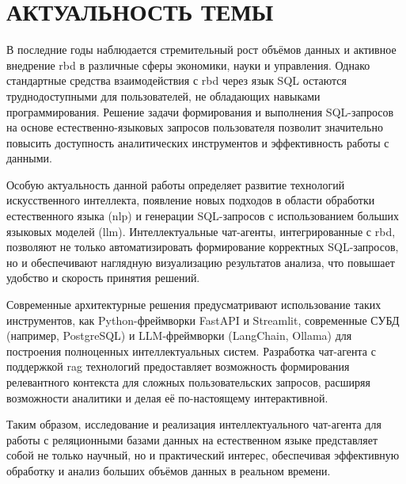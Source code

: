 \section{АКТУАЛЬНОСТЬ ТЕМЫ}

В последние годы наблюдается стремительный рост объёмов данных и активное внедрение \gls{rbd} в различные сферы экономики, науки и управления. Однако стандартные средства взаимодействия с \gls{rbd} через язык SQL остаются труднодоступными для пользователей, не обладающих навыками программирования. Решение задачи формирования и выполнения SQL-запросов на основе естественно-языковых запросов пользователя позволит значительно повысить доступность аналитических инструментов и эффективность работы с данными.

Особую актуальность данной работы определяет развитие технологий искусственного интеллекта, появление новых подходов в области обработки естественного языка (\gls{nlp}) и генерации SQL-запросов с использованием больших языковых моделей (\gls{llm}). Интеллектуальные чат-агенты, интегрированные с \gls{rbd}, позволяют не только автоматизировать формирование корректных SQL-запросов, но и обеспечивают наглядную визуализацию результатов анализа, что повышает удобство и скорость принятия решений.

Современные архитектурные решения предусматривают использование таких инструментов, как Python-фреймворки FastAPI и Streamlit, современные СУБД (например, PostgreSQL) и LLM-фреймворки (LangChain, Ollama) для построения полноценных интеллектуальных систем. Разработка чат-агента с поддержкой \gls{rag} технологий предоставляет возможность формирования релевантного контекста для сложных пользовательских запросов, расширяя возможности аналитики и делая её по-настоящему интерактивной.

Таким образом, исследование и реализация интеллектуального чат-агента для работы с реляционными базами данных на естественном языке представляет собой не только научный, но и практический интерес, обеспечивая эффективную обработку и анализ больших объёмов данных в реальном времени.


